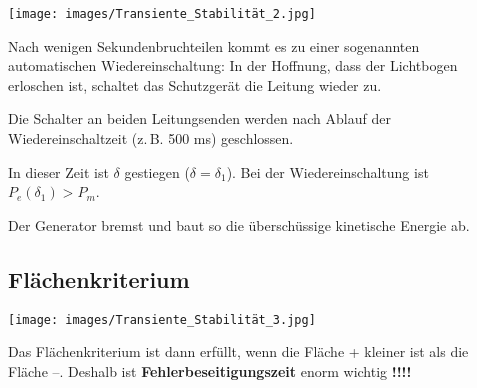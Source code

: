 \texttt{[image: images/Transiente\_Stabilität\_2.jpg]}

\vspace{0.15cm}

Nach wenigen Sekundenbruchteilen kommt es zu einer sogenannten automatischen Wiedereinschaltung: In der Hoffnung, dass der Lichtbogen erloschen ist, schaltet das Schutzgerät die Leitung wieder zu. 

Die Schalter an beiden Leitungsenden werden nach Ablauf der Wiedereinschaltzeit (z.\,B. 500 ms) geschlossen.

\vspace{0.15cm}

In dieser Zeit ist $\delta$ gestiegen ($\delta = \delta_1$). Bei der Wiedereinschaltung ist $P_e(\delta_1) > P_m$. 

Der Generator bremst und baut so die überschüssige kinetische Energie ab.




\subsection{Flächenkriterium}

\texttt{[image: images/Transiente\_Stabilität\_3.jpg]}

\vspace{0.15cm}

Das Flächenkriterium ist dann erfüllt, wenn die Fläche + kleiner ist als die Fläche –.
Deshalb ist \textbf{Fehlerbeseitigungszeit} enorm wichtig \textbf{!!!!}

